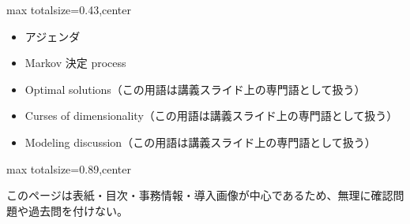 \clearpage
{}
\begin{minipage}[t]{0.405\textwidth}
\begin{adjustbox}{max totalsize={\textwidth}{0.43\textheight},center}
\begin{minipage}{\textwidth}\scriptsize
{}\begin{itemize}
\item アジェンダ
\item Markov 決定 process
\item Optimal solutions（この用語は講義スライド上の専門語として扱う）
\item Curses of dimensionality（この用語は講義スライド上の専門語として扱う）
\item Modeling discussion（この用語は講義スライド上の専門語として扱う）
\end{itemize}
\end{minipage}
\end{adjustbox}
\end{minipage}\hfill
\begin{minipage}[t]{0.58\textwidth}
\begin{adjustbox}{max totalsize={\textwidth}{0.89\textheight},center}
\begin{minipage}{\textwidth}\scriptsize
{}このページは表紙・目次・事務情報・導入画像が中心であるため、無理に確認問題や過去問を付けない。
\end{minipage}
\end{adjustbox}
\end{minipage}


